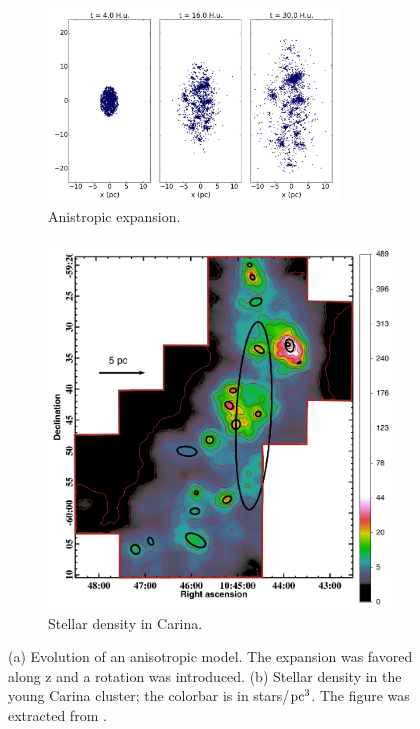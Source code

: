 \begin{figure}
    \centering
    \begin{subfigure}[b]{\textwidth}
        \centering
        \includegraphics[width=0.85\textwidth]{Figures/7_anisotropic.png}
        \caption{Anistropic \HubLem expansion.}
        \label{Fig:7_anistropic}
    \end{subfigure}
    
    \begin{subfigure}[b]{0.6\textwidth}
        \centering
        \includegraphics[width=\textwidth]{Figures/7_carina.png}
        \caption{Stellar density in Carina.}
        \label{Fig:7_carina}
    \end{subfigure}
     \caption{(a) Evolution of an anisotropic \HubLem model. The expansion was favored along z and a rotation was introduced. (b) Stellar density in the young Carina cluster; the colorbar is in stars/${\textrm{pc}}^3$. The figure was extracted from \protect\cite{Kuhn2014}.}
     \label{Fig:7_filament}
\end{figure}




